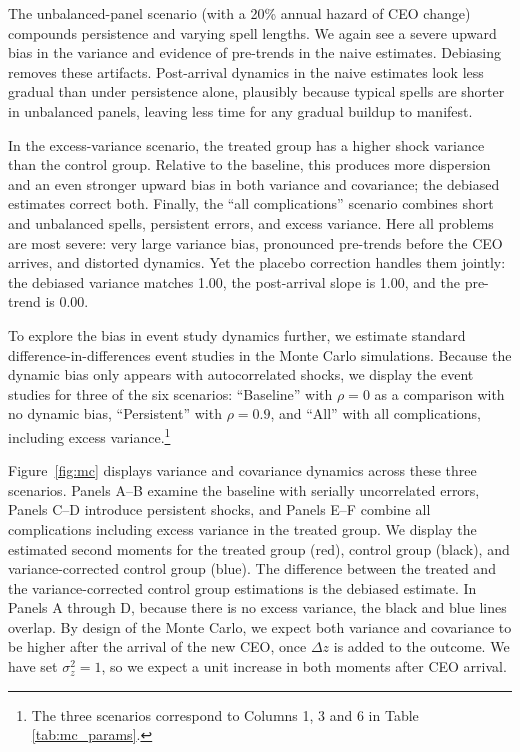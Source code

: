 \documentclass[11pt,a4paper]{article}
\begin{document}
The unbalanced-panel scenario (with a 20\% annual hazard of CEO change) compounds persistence and varying spell lengths. We again see a severe upward bias in the variance and evidence of pre-trends in the naive estimates. Debiasing removes these artifacts. Post-arrival dynamics in the naive estimates look less gradual than under persistence alone, plausibly because typical spells are shorter in unbalanced panels, leaving less time for any gradual buildup to manifest.

In the excess-variance scenario, the treated group has a higher shock variance than the control group. Relative to the baseline, this produces more dispersion and an even stronger upward bias in both variance and covariance; the debiased estimates correct both. Finally, the ``all complications'' scenario combines short and unbalanced spells, persistent errors, and excess variance. Here all problems are most severe: very large variance bias, pronounced pre-trends before the CEO arrives, and distorted dynamics. Yet the placebo correction handles them jointly: the debiased variance matches 1.00, the post-arrival slope is 1.00, and the pre-trend is 0.00. 

To explore the bias in event study dynamics further, we estimate standard difference-in-differences event studies \citep{Callaway2021JoLE} in the Monte Carlo simulations. Because the dynamic bias only appears with autocorrelated shocks, we display the event studies for three of the six scenarios: ``Baseline'' with $\rho=0$ as a comparison with no dynamic bias, ``Persistent'' with $\rho=0.9$, and ``All'' with all complications, including excess variance.\footnote{The three scenarios correspond to Columns 1, 3 and 6 in Table \ref{tab:mc_params}.}

Figure~\ref{fig:mc} displays variance and covariance dynamics across these three scenarios. Panels A--B examine the baseline with serially uncorrelated errors, Panels C--D introduce persistent shocks, and Panels E--F combine all complications including excess variance in the treated group. We display the estimated second moments for the treated group (red), control group (black), and variance-corrected control group (blue). The difference between the treated and the variance-corrected control group estimations is the debiased estimate. In Panels A through D, because there is no excess variance, the black and blue lines overlap. By design of the Monte Carlo, we expect both variance and covariance to be higher after the arrival of the new CEO, once $\Delta z$ is added to the outcome. We have set $\sigma^2_z=1$, so we expect a unit increase in both moments after CEO arrival.
\end{document}
